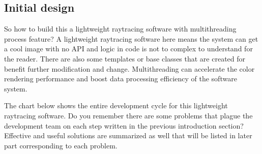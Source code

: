 \documentclass[11pt]{article}
\begin{document}
\subsection{Initial design}
So how to build this a lightweight raytracing software with multithreading process feature? 
A lightweight raytracing software here means the system can get a cool image with no API and logic in code is not to complex to understand for the reader. There are also some templates or base classes that are created for benefit further modification and change. Multithreading can accelerate the color rendering performance and boost data processing efficiency of the software system.

The chart below shows the entire development cycle for this lightweight raytracing software. Do you remember there are some problems that plague the development team on each step written in the previous introduction section?  Effective and useful solutions are summarized as well that will be listed in later part corresponding to each problem.\\
\end{document}
